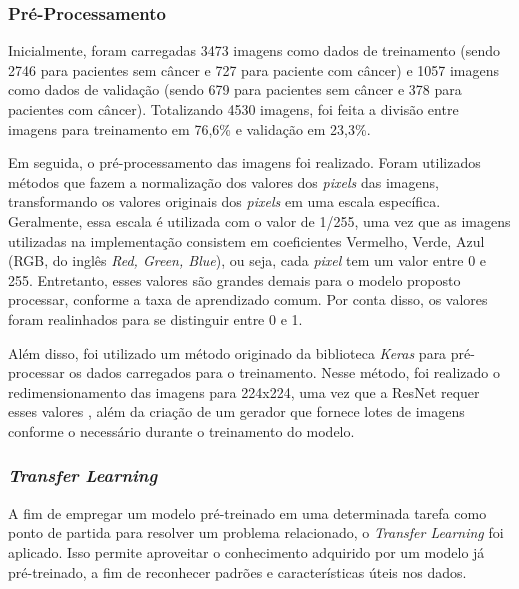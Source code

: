 
\subsubsection{\esp Pré-Processamento} \label{preprocess}
Inicialmente, foram carregadas 3473 imagens como dados de treinamento (sendo 2746 para pacientes sem câncer e 727 para paciente com câncer) e 1057 imagens como dados de validação (sendo 679 para pacientes sem câncer e 378 para pacientes com câncer). Totalizando 4530 imagens, foi feita a divisão entre imagens para treinamento em 76,6\% e validação em 23,3\%.

Em seguida, o pré-processamento das imagens foi realizado. Foram utilizados métodos que fazem a normalização dos valores dos \textit{pixels} das imagens, transformando os valores originais dos \textit{pixels} em uma escala específica. Geralmente, essa escala é utilizada com o valor de 1/255, uma vez que as imagens utilizadas na implementação consistem em coeficientes Vermelho, Verde, Azul (RGB, do inglês \textit{Red, Green, Blue}), ou seja, cada \textit{pixel} tem um valor entre 0 e 255. Entretanto, esses valores são grandes demais para o modelo proposto processar, conforme a taxa de aprendizado comum. Por conta disso, os valores foram realinhados para se distinguir entre 0 e 1.

Além disso, foi utilizado um método originado da biblioteca \textit{Keras} para pré-processar os dados carregados para o treinamento. Nesse método, foi realizado o redimensionamento das imagens para 224x224, uma vez que a ResNet requer esses valores \cite{kerasresnet50}, além da criação de um gerador que fornece lotes de imagens conforme o necessário durante o treinamento do modelo.


\subsubsection{\esp \textit{Transfer Learning}} \label{transfer}

A fim de empregar um modelo pré-treinado em uma determinada tarefa como ponto de partida para resolver um problema relacionado, o \textit{Transfer Learning} foi aplicado. Isso permite aproveitar o conhecimento adquirido por um modelo já pré-treinado, a fim de reconhecer padrões e características úteis nos dados. 

